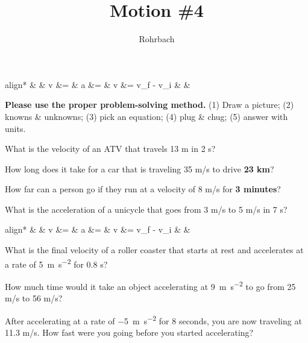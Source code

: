 \documentclass[12pt]{exam}
\title{Motion \#4}
\author{Rohrbach}
\newcommand{\printeqs}{
  \begin{center}
    \vspace{-1cm}
    \begin{empheq}[box=\fbox]{align*}
     &
     & 
      v &= \frac{d}{t}        &    
      a &= \frac{\Delta v}{t} &
      \Delta v &= v_f - v_i   &
     &
    \end{empheq}
  \end{center}
}
\begin{document}
\maketitle

\printeqs

\noindent
{\bf Please use the proper problem-solving method.}  (1) Draw a picture; (2) knowns \& unknowns; (3) pick an equation; (4) plug \& chug; (5) answer with units.


\begin{questions}

\question
  What is the velocity of an ATV that travels 13 m in 2 s?
  \vs

\question
  How long does it take for a car that is traveling 
  35 m/s to drive {\bf 23 km}?
  \vs

\question
  How far can a person go if they run at a velocity of 
  8 m/s for {\bf 3 minutes}?
  \vs

\question
  What is the acceleration of a unicycle that goes from 
  3 m/s to 5 m/s in 7 s?
  \vs

\pagebreak

\printeqs


\question
  What is the final velocity of a roller coaster 
  that starts at rest and accelerates at a rate of 
  \SI{5}{\meter\per\second^2} for 0.8 s?
  \vs


\question
  How much time would it take an object accelerating 
  at \SI{9}{\meter\per\second^2} to go from 25 m/s to 56 m/s?
  \vs


\question
  After accelerating at a rate of \SI{-5}{\meter\per\second^2}
  for 8 seconds, you are now traveling at 11.3 m/s.  How fast 
  were you going before you started accelerating?
  \vs



  
\end{questions}
\end{document}
